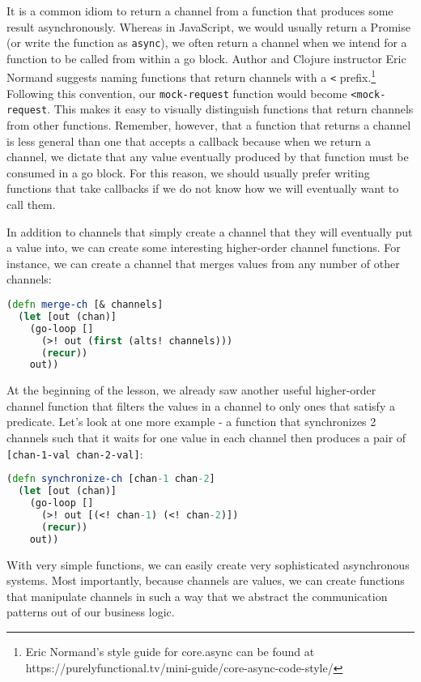 \documentclass[10pt,twoside,openright]{memoir}
\begin{document}
It is a common idiom to return a channel from a function that produces
some result asynchronously. Whereas in JavaScript, we would usually
return a Promise (or write the function as \texttt{async}), we often
return a channel when we intend for a function to be called from within
a go block. Author and Clojure instructor Eric Normand suggests naming
functions that return channels with a \texttt{\textless{}}
prefix.\footnote{Eric Normand's style guide for core.async can be found
  at https://purelyfunctional.tv/mini-guide/core-async-code-style/}
Following this convention, our \texttt{mock-request} function would
become \texttt{\textless{}mock-request}. This makes it easy to visually
distinguish functions that return channels from other functions.
Remember, however, that a function that returns a channel is less
general than one that accepts a callback because when we return a
channel, we dictate that any value eventually produced by that function
must be consumed in a go block. For this reason, we should usually
prefer writing functions that take callbacks if we do not know how we
will eventually want to call them.

In addition to channels that simply create a channel that they will
eventually put a value into, we can create some interesting higher-order
channel functions. For instance, we can create a channel that merges
values from any number of other channels:

\begin{lstlisting}[language=Clojure]
(defn merge-ch [& channels]
  (let [out (chan)]
    (go-loop []
      (>! out (first (alts! channels)))
      (recur))
    out))
\end{lstlisting}

At the beginning of the lesson, we already saw another useful
higher-order channel function that filters the values in a channel to
only ones that satisfy a predicate. Let's look at one more example - a
function that synchronizes 2 channels such that it waits for one value
in each channel then produces a pair of
\texttt{{[}chan-1-val\ chan-2-val{]}}:

\begin{lstlisting}[language=Clojure]
(defn synchronize-ch [chan-1 chan-2]
  (let [out (chan)]
    (go-loop []
      (>! out [(<! chan-1) (<! chan-2)])
      (recur))
    out))
\end{lstlisting}

With very simple functions, we can easily create very sophisticated
asynchronous systems. Most importantly, because channels are values, we
can create functions that manipulate channels in such a way that we
abstract the communication patterns out of our business logic.
\end{document}
